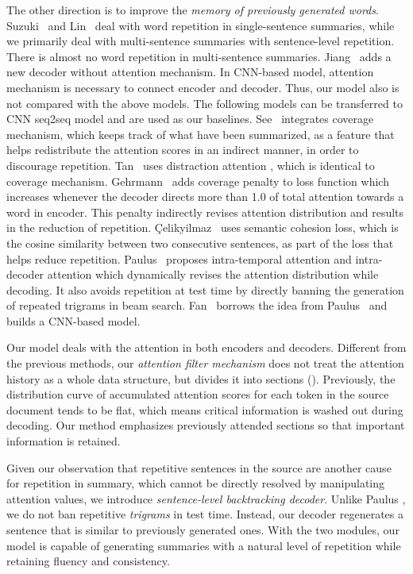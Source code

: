 The other direction is to improve the 
{\em memory of previously generated words}.
Suzuki~\cite{SuzukiN17} and Lin~\cite{LinSMS18} 
deal with word repetition in single-sentence summaries, 
while we primarily deal with multi-sentence summaries with 
sentence-level repetition. 
There is almost no word repetition in multi-sentence summaries.
Jiang~\cite{JiangB18} adds a new decoder without attention mechanism.
In CNN-based model, attention mechanism is necessary to connect encoder 
and decoder.
Thus, our model also is not compared with the above models. 
The following models can be transferred to CNN seq2seq model and
are used as our baselines.
See~\cite{SeeLM17} integrates coverage mechanism, 
which keeps track of what have been summarized, as a feature that helps 
redistribute the attention scores in an indirect manner,
in order to discourage repetition. 
Tan~\cite{TanWX17} uses distraction attention
\cite{ChenZLWJ16}, which is identical to coverage mechanism. 
Gehrmann~\cite{GehrmannDR18} adds coverage penalty to loss function
which increases whenever the decoder directs more than 1.0 of total attention
towards a word in encoder.
This penalty indirectly revises attention distribution and results in
the reduction of repetition.
{\c{C}}elikyilmaz~\cite{elikyilmazBHC18} uses semantic cohesion loss,
which is the cosine similarity between two consecutive sentences, as part of
the loss that helps reduce repetition.
Paulus~\cite{PaulusXS17} proposes intra-temporal attention \cite{NallapatiZSGX16} and 
intra-decoder attention which dynamically revises the attention distribution while decoding. 
It also avoids repetition at test time by directly banning the generation of 
repeated trigrams in beam search. 
Fan~\cite{FanGA18} borrows the idea from Paulus~\cite{PaulusXS17} and 
builds a CNN-based model. 

Our model deals with the attention in both encoders and decoders. 
Different from the previous methods, 
our \textit{attention filter mechanism} does not 
treat the attention history as a whole data structure,  
but divides it into sections (). 
Previously, the distribution curve of accumulated attention scores 
for each token in the source document tends to be flat, 
which means critical information is washed out during decoding.
Our method emphasizes previously attended sections 
so that important information is retained.

Given our observation that repetitive sentences in the source are
another cause for repetition in summary, 
which cannot be directly resolved by manipulating attention values, 
we introduce \textit{sentence-level backtracking decoder}. 
Unlike Paulus \cite{PaulusXS17}, 
we do not ban repetitive \textit{trigrams} in test time. 
Instead, our decoder regenerates a sentence that is similar to previously generated ones.
With the two modules, our model is capable of generating summaries with a
natural level of repetition while retaining fluency and consistency.

